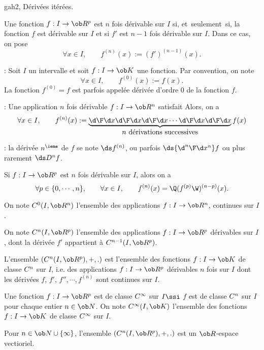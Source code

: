 \Subsection gah2, Dérivées itérées. 

\Definition [$I$ intervalle, $n\ge2$] 
Une fonction $f:I\to\ob R^p$ est $n$ fois dérivable sur $I$ si, et~seulement~si, la fonction $f$ est dérivable sur $I$ et si $f'$ est $n-1$ fois 
dérivable sur $I$. Dans ce cas, on pose 
$$
\forall x\in I,\qquad f^{(n)}(x):=(f')^{(n-1)}(x). 
$$


\Remarque : Soit $I$ un intervalle et soit $f:I\to\ob K$ une fonction. Par convention, on note 
$$
\forall x\in I, \qquad f^{(0)}(x):=f(x).
$$
La fonction $f^{(0)}=f$ est parfois appelée dérivée d'ordre $0$ de la fonction $f$. 
\bigskip

\Remarque : Une application $n$ fois dérivable $f:I\to\ob R^n$ satisfait 
Alors, on a 
$$
\forall x\in I, \qquad f^{(n)}(x):=\underbrace{{\d\F \d x}{\d\F\d x}{\d\F \d x}\cdots{\d\F \d x}{\d\F \d x}}_{\mbox{$n$ dérivations successives}}f(x)
$$

\Remarque : la dérivée $n^\ieme$ de $f$ se note $\ds f^{(n)}$, ou parfois $\ds{\d^n\F\d x^n}f$ ou plus rarement $\ds D^nf$. 
\bigskip

\Propriete [$I$ intervalle, $n\ge2$]
Si $f:I\to\ob R^p$ est $n$ fois dérivable sur $I$, alors on a 
$$
\forall p\in\{0,\cdots, n\}, \qquad \forall x\in I, \qquad f^{(n)}(x)=\Q(f^{(p)}\W)^{(n-p)}(x).
$$

On note $\sc C^0(I,\ob R^n)$ l'ensemble des applications $f:I\to\ob R^n$, continues sur $I$. 

On note $\sc C^n(I,\ob R^p)$ l'ensemble des applications $f:I\to\ob R^p$ 
dérivables sur $I$, dont la dérivée $f'$ appartient à $\sc C^{n-1}(I,\ob R^p)$. 


L'ensemble $(\sc C^n(I,\ob R^p), +, .)$ est l'ensemble des fonctions $f:I\to\ob K$ de classe $\sc C^n$ sur $I$, i.e. des applications $f:I\to\ob R^p$ dérivables $n$ fois sur $I$ dont les dérivées $f$, $f'$, $f'', \cdots, f^{(n)}$ sont continues sur $I$. 

Une fonction $f:I\to\ob R^p$ est de classe $\sc C^\infty$ sur $I\ssi$ $f$ est de classe $\sc C^n$ sur $I$ pour chaque entier $n\in\ob N$. \pn
On note $\sc C^\infty(I,\ob K)$ l'ensemble des fonctions $f:I\to\ob K$ de classe $\sc C^\infty$ sur $I$. 

\Propriete Pour $n\in\ob N\cup\{\infty\}$, l'ensemble $(\sc C^n(I,\ob R^p), +, .)$ est un $\ob R$-espace vectioriel. 

